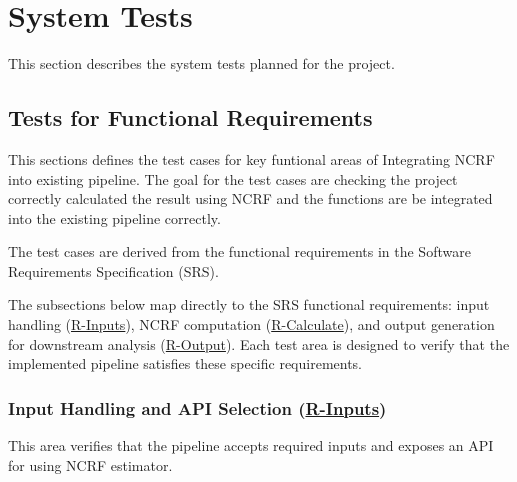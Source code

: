 \documentclass[12pt, titlepage]{article}
\begin{document}


\section{System Tests}
This section describes the system tests planned for the project.

\subsection{Tests for Functional Requirements}
This sections defines the test cases for key funtional areas of Integrating NCRF into existing pipeline. The goal for the test cases are checking the project correctly calculated the result using NCRF and the functions are be integrated into the existing pipeline correctly.

The test cases are derived from the functional requirements in the Software Requirements Specification (SRS).


The subsections below map directly to the SRS functional requirements:
input handling (\hyperref[R-Inputs]{R-Inputs}), NCRF computation (\hyperref[R-Calculate]{R-Calculate}), and
output generation for downstream analysis (\hyperref[R-Output]{R-Output}). Each test area
is designed to verify that the implemented pipeline satisfies these specific
requirements.


\subsubsection{Input Handling and API Selection (\hyperref[R-Inputs]{R-Inputs})}
This area verifies that the pipeline accepts required inputs and exposes an API for using NCRF estimator.
		
\end{document}
